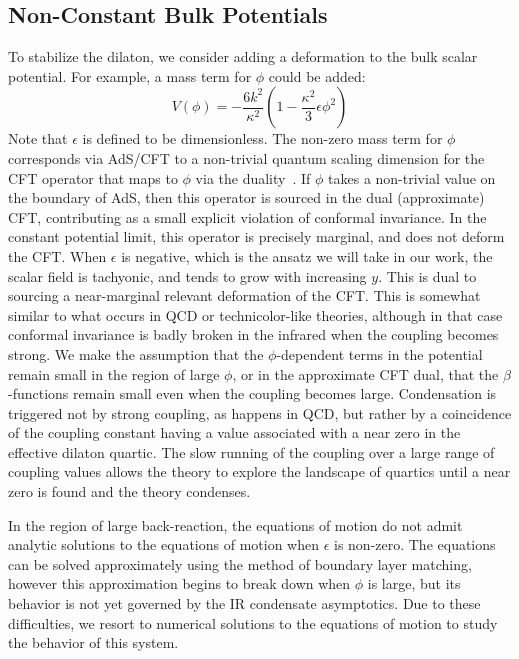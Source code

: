 \documentclass[12pt]{article}
\begin{document}
\subsection{Non-Constant Bulk Potentials}
To stabilize the dilaton, we consider adding a deformation to the bulk scalar potential.  For example, a mass term for $\phi$ could be added:
\begin{equation}
V(\phi) = - \frac{6 k^2}{\kappa^2} \left( 1 - \frac{\kappa^2}{3} \epsilon \phi^2 \right)
\label{eq:bulkpot}
\end{equation}
Note that $\epsilon$ is defined to be dimensionless.  The non-zero mass term for $\phi$ corresponds via AdS/CFT to a non-trivial quantum scaling dimension for the CFT operator that maps to $\phi$ via the duality~\cite{Witten:1998qj}.  If $\phi$ takes a non-trivial value on the boundary of AdS, then this operator is sourced in the dual (approximate) CFT, contributing as a small explicit violation of conformal invariance.  In the constant potential limit, this operator is precisely marginal, and does not deform the CFT.  When $\epsilon$ is negative, which is the ansatz we will take in our work, the scalar field is tachyonic, and tends to grow with increasing $y$.  This is dual to sourcing a near-marginal relevant deformation of the CFT.  This is somewhat similar to what occurs in QCD or technicolor-like theories, although in that case conformal invariance is badly broken in the infrared when the coupling becomes strong.  We make the assumption that the $\phi$-dependent terms in the potential remain small in the region of large $\phi$, or in the approximate CFT dual, that the $\beta$-functions remain small even when the coupling becomes large.  Condensation is triggered not by strong coupling, as happens in QCD, but rather by a coincidence of the coupling constant having a value associated with a near zero in the effective dilaton quartic.  The slow running of the coupling over a large range of coupling values allows the theory to explore the landscape of quartics until a near zero is found and the theory condenses.

In the region of large back-reaction, the equations of motion do not admit analytic solutions to the equations of motion when $\epsilon$ is non-zero.  The equations can be solved approximately using the method of boundary layer matching, however this approximation begins to break down when $\phi$ is large, but its behavior is not yet governed by the IR condensate asymptotics.  Due to these difficulties, we resort to numerical solutions to the equations of motion to study the behavior of this system.
\end{document}

